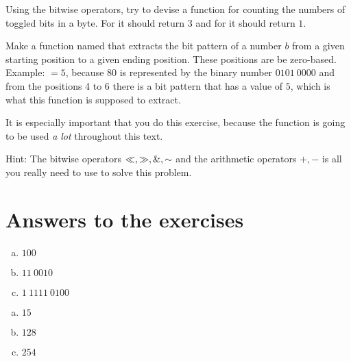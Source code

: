 \begin{Exercise}[label={bitcount}]
  Using the bitwise operators, try to devise a function
   for counting the numbers of toggled bits in a
  byte. For  it should return $3$ and for
   it should return $1$.

\end{Exercise}

\begin{Exercise}[label={getbits}]

  Make a function named  that extracts
  the bit pattern of a number $b$ from a given starting position to a
  given ending position. These positions are be zero-based. Example:
  $=5$, because $80$ is represented by the
  binary number $0101\ 0000$ and from the positions 4 to 6 there is a
  bit pattern that has a value of $5$, which is what this function is
  supposed to extract.

  It is especially important that you do this exercise, because the
  function  is going to be used \textit{a lot}
  throughout this text.

  Hint: The bitwise operators $\ll, \gg, \mathrel{\&},
  \mathord{\sim}$ and the arithmetic operators $+,-$ is all you really need to
  use to solve this problem.

\end{Exercise}

\section{Answers to the exercises}

\begin{Answer}[ref={n-to-bin}]
  \begin{enumerate}[(a)]
  \item $100$
  \item $11\ 0010$
  \item $1\ 1111\ 0100$
  \end{enumerate}
\end{Answer}

\begin{Answer}[ref={bin-to-n}]
  \begin{enumerate}[(a)]
  \item $15$
  \item $128$
  \item $254$
  \end{enumerate}
\end{Answer}

